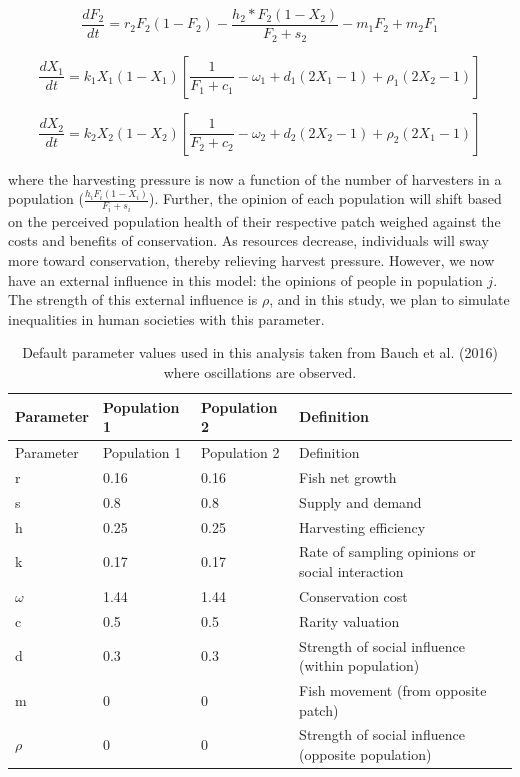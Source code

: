 \documentclass[
  12pt,
]{article}
\begin{document}
\begin{equation}
\frac{dF_2}{dt} = r_2F_2(1-F_2)-\frac{h_2*F_2(1-X_2)}{F_2 + s_2} -m_1F_2 + m_2F_1
  \label{eq:FishWhole2}
\end{equation}

\begin{equation}
\frac{dX_1}{dt} =  k_1X_1(1-X_1) [\frac{1}{F_1+c_1} - \omega_1 + d_1(2X_1 - 1) + \rho_1(2X_2 - 1)]
  \label{eq:SocWhole1}
\end{equation}

\begin{equation}
\frac{dX_2}{dt} = k_2X_2(1-X_2)  [\frac{1}{F_2+c_2} - \omega_2 + d_2(2X_2 - 1) +  \rho_2(2X_1 - 1)]
  \label{eq:SocWhole2}
\end{equation}

where the harvesting pressure is now a function of the number of harvesters in a population (\(\frac{h_iF_i(1-X_i)}{F_i + s_i}\)). Further, the opinion of each population will shift based on the perceived population health of their respective patch weighed against the costs and benefits of conservation. As resources decrease, individuals will sway more toward conservation, thereby relieving harvest pressure. However, we now have an external influence in this model: the opinions of people in population \(j\). The strength of this external influence is \(\rho\), and in this study, we plan to simulate inequalities in human societies with this parameter.



\begin{longtable}[]{@{}llll@{}}
\caption{\label{tab:DefaultParamTable}Default parameter values used in this analysis taken from Bauch et al. (2016) where oscillations are observed. \label{DefaultParamTable}}\tabularnewline
\toprule\noalign{}
Parameter & Population 1 & Population 2 & Definition \\
\midrule\noalign{}
\endfirsthead
\toprule\noalign{}
Parameter & Population 1 & Population 2 & Definition \\
\midrule\noalign{}
\endhead
\bottomrule\noalign{}
\endlastfoot
r & 0.16 & 0.16 & Fish net growth \\
s & 0.8 & 0.8 & Supply and demand \\
h & 0.25 & 0.25 & Harvesting efficiency \\
k & 0.17 & 0.17 & Rate of sampling opinions or social interaction \\
\(\omega\) & 1.44 & 1.44 & Conservation cost \\
c & 0.5 & 0.5 & Rarity valuation \\
d & 0.3 & 0.3 & Strength of social influence (within population) \\
m & 0 & 0 & Fish movement (from opposite patch) \\
\(\rho\) & 0 & 0 & Strength of social influence (opposite population) \\
\end{longtable}
\end{document}
